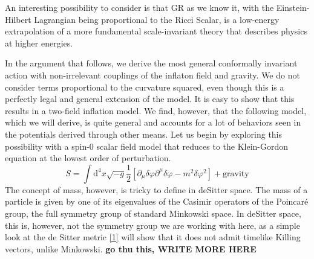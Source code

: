 \documentclass[aps,prd,reprint,preprintnumbers,showpacs,floatfix,nofootinbib,superscript address]{revtex4-2}
\begin{document}
An interesting possibility to consider is that GR as we know it, with the Einstein-Hilbert Lagrangian being proportional to the Ricci Scalar, is a low-energy extrapolation of a more fundamental scale-invariant theory that describes physics at higher energies. 

In the argument that follows, we derive the most general conformally invariant action with non-irrelevant couplings of the inflaton field and gravity. We do not consider terms proportional to the curvature squared, even though this is a perfectly legal and general extension of the model. It is easy to show that this results in a two-field inflation model. We find, however, that the following model, which we will derive, is quite general and accounts for a lot of behaviors seen in the potentials derived through other means. Let us begin by exploring this possibility with a spin-0 scalar field model that reduces to the Klein-Gordon equation at the lowest order of perturbation.
\begin{equation} \label{25}
    S = \int \mathrm{d}^4 x \sqrt{-g} \frac{1}{2} \left[ \partial_\mu \delta \varphi \partial^\mu \delta \varphi - m^2   \delta\varphi^2   \right] + \text{gravity}
\end{equation}
The concept of mass, however, is tricky to define in deSitter space. The mass of a particle is given by one of its eigenvalues of the Casimir operators of the Poincaré group, the full symmetry group of standard Minkowski space. In deSitter space, this is, however, not the symmetry group we are working with here, as a simple look at the de Sitter metric \ref{1} will show that it does not admit timelike Killing vectors, unlike Minkowski.  \textbf{go thu this, WRITE MORE HERE}

\end{document}
